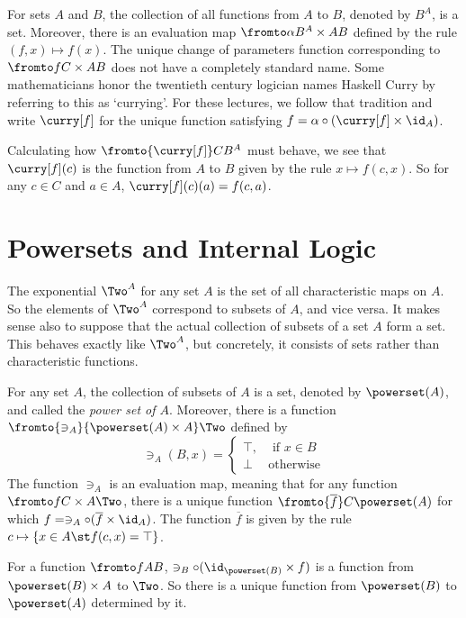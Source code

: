 \begin{principle}
	For sets $A$ and $B$, the collection of all functions from $A$ to $B$, denoted by $B^A$, is a set.
	Moreover, there is an evaluation map $\fromto \alpha{B^A\times A}B$ defined by the rule $(f,x) \mapsto f(x)$.
	The unique change of parameters function corresponding to $\fromto f{C\times A}B$ does not have a completely standard name.
	Some mathematicians honor the twentieth century logician names Haskell Curry by referring to this as `currying'.
	For these lectures, we follow that tradition and write $\curry[f]$ for the unique function satisfying $f = \alpha\circ (\curry[f] \times \id_A)$.
	
	Calculating how $\fromto {\curry[f]}C{B^A}$ must behave, we see that $\curry[f](c)$ is the function from $A$ to $B$ given by the rule $x\mapsto f(c,x)$.
	So for any $c\in C$ and $a\in A$, $\curry[f](c)(a) = f(c,a)$. 
\end{principle}


\chapter{Powersets and Internal Logic}

The exponential $\Two^A$ for any set $A$ is the set of all characteristic maps on $A$.
So the elements of $\Two^A$ correspond to subsets of $A$, and vice versa.
It makes sense also to suppose that the actual collection of subsets of a set $A$ form a set.
This behaves exactly like $\Two^A$, but concretely, it consists of sets rather than characteristic functions.

\begin{principle}\label{ax:powerset}
	For any set $A$, the collection of subsets of $A$ is a set, denoted by $\powerset(A)$, and called the \emph{power set of $A$}. Moreover, there is a function $\fromto {\ni_A}{\powerset(A)\times A}\Two$ defined by 
	\[\ni_A(B,x) = \begin{cases}
		\top, &\text{ if } x\in B\\
		\bot &\text{otherwise}
	\end{cases}
	\]
	The function $\ni_A$ is an evaluation map, meaning that 
	for any function $\fromto f{C\times A}\Two$, there is a unique function $\fromto {\overline{f}}C{\powerset(A)}$ for which $f = \ni_A\circ (\overline{f} \times \id_A)$. The function $\overline f$ 
	is given by the rule $c\mapsto \{x\in A\st f(c,x)=\top\}$.
\end{principle}

For a function $\fromto fAB$, $\ni_B\circ (\id_{\powerset(B)}\times f)$ is a function from $\powerset(B)\times A$ to $\Two$. So there is a unique function
from $\powerset(B)$ to $\powerset(A)$ determined by it. 

